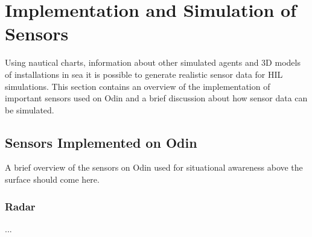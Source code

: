 \chapter{Implementation and Simulation of Sensors}
Using nautical charts, information about other simulated agents and 3D models of installations in sea it is possible to generate realistic sensor data for HIL simulations. This section contains an overview of the implementation of important sensors used on Odin and a brief discussion about how sensor data can be simulated.

\section{Sensors Implemented on Odin}
A brief overview of the sensors on Odin used for situational awareness above the surface should come here.

\subsection{Radar}
...

\newpage

